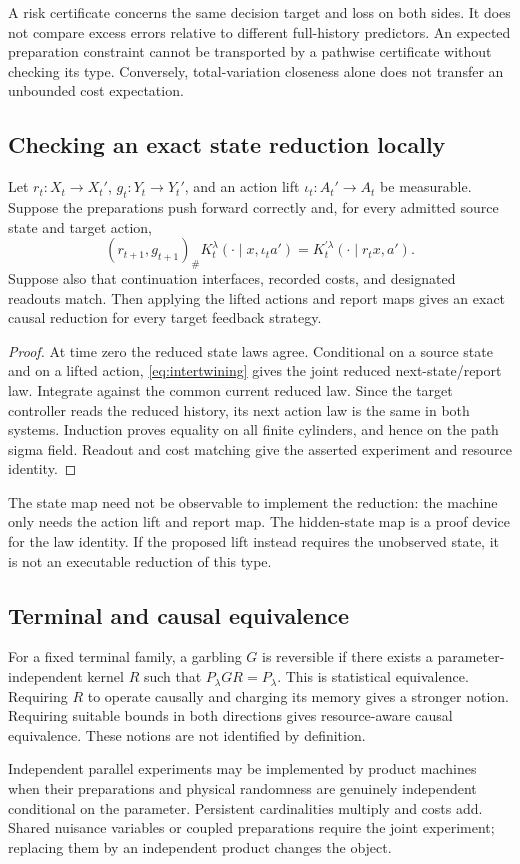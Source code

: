 A risk certificate concerns the same decision target and loss on both sides.
It does not compare excess errors relative to different full-history
predictors. An expected preparation constraint cannot be transported by a
pathwise certificate without checking its type. Conversely, total-variation
closeness alone does not transfer an unbounded cost expectation.

\subsection{Checking an exact state reduction locally}
\begin{proposition}\label{prop:one-step}
Let $r_t:X_t\to X_t'$, $g_t:Y_t\to Y_t'$, and an action lift
$\iota_t:A_t'\to A_t$ be measurable. Suppose the preparations push forward
correctly and, for every admitted source state and target action,
\begin{equation}\label{eq:intertwining}
 (r_{t+1},g_{t+1})_\#
 K_t^\lambda(\cdot\mid x,\iota_ta')
 =K_t^{\prime\lambda}(\cdot\mid r_tx,a').
\end{equation}
Suppose also that continuation interfaces, recorded costs, and designated
readouts match. Then applying the lifted actions and report maps gives an
exact causal reduction for every target feedback strategy.
\end{proposition}
\begin{proof}
At time zero the reduced state laws agree. Conditional on a source state and
on a lifted action, \eqref{eq:intertwining} gives the joint reduced
next-state/report law. Integrate against the common current reduced law.
Since the target controller reads the reduced history, its next action law
is the same in both systems. Induction proves equality on all finite
cylinders, and hence on the path sigma field. Readout and cost matching give
the asserted experiment and resource identity.
\end{proof}

The state map need not be observable to implement the reduction: the
machine only needs the action lift and report map. The hidden-state map is
a proof device for the law identity. If the proposed lift instead requires
the unobserved state, it is not an executable reduction of this type.

\subsection{Terminal and causal equivalence}
For a fixed terminal family, a garbling $G$ is reversible if there exists a
parameter-independent kernel $R$ such that $P_\lambda GR=P_\lambda$.
This is statistical equivalence. Requiring $R$ to operate causally and
charging its memory gives a stronger notion. Requiring suitable bounds in
both directions gives resource-aware causal equivalence. These notions are
not identified by definition.

Independent parallel experiments may be implemented by product machines
when their preparations and physical randomness are genuinely independent
conditional on the parameter. Persistent cardinalities multiply and costs
add. Shared nuisance variables or coupled preparations require the joint
experiment; replacing them by an independent product changes the object.
